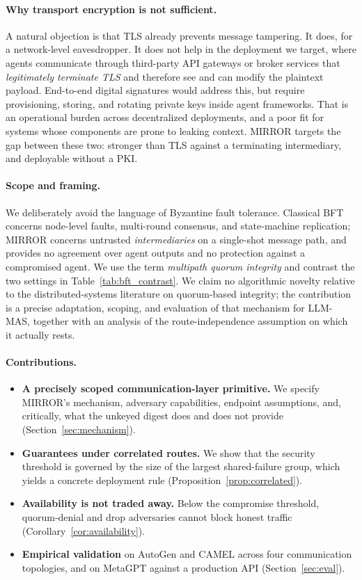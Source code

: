 \documentclass{article}
\begin{document}
\paragraph{Why transport encryption is not sufficient.}
A natural objection is that TLS already prevents message tampering. It does, for a network-level eavesdropper. It does not help in the deployment we target, where agents communicate through third-party API gateways or broker services that \emph{legitimately terminate TLS} and therefore see and can modify the plaintext payload. End-to-end digital signatures would address this, but require provisioning, storing, and rotating private keys inside agent frameworks. That is an operational burden across decentralized deployments, and a poor fit for systems whose components are prone to leaking context. MIRROR targets the gap between these two: stronger than TLS against a terminating intermediary, and deployable without a PKI.

\paragraph{Scope and framing.}
We deliberately avoid the language of Byzantine fault tolerance. Classical BFT \citep{lamport1982byzantine, castro1999pbft} concerns node-level faults, multi-round consensus, and state-machine replication; MIRROR concerns untrusted \emph{intermediaries} on a single-shot message path, and provides no agreement over agent outputs and no protection against a compromised agent. We use the term \emph{multipath quorum integrity} and contrast the two settings in Table~\ref{tab:bft_contrast}. We claim no algorithmic novelty relative to the distributed-systems literature on quorum-based integrity; the contribution is a precise adaptation, scoping, and evaluation of that mechanism for LLM-MAS, together with an analysis of the route-independence assumption on which it actually rests.

\paragraph{Contributions.}
\begin{itemize}
    \item \textbf{A precisely scoped communication-layer primitive.} We specify MIRROR's mechanism, adversary capabilities, endpoint assumptions, and, critically, what the unkeyed digest does and does not provide (Section~\ref{sec:mechanism}).
    \item \textbf{Guarantees under correlated routes.} We show that the security threshold is governed by the size of the largest shared-failure group, which yields a concrete deployment rule (Proposition~\ref{prop:correlated}).
    \item \textbf{Availability is not traded away.} Below the compromise threshold, quorum-denial and drop adversaries cannot block honest traffic (Corollary~\ref{cor:availability}).
    \item \textbf{Empirical validation} on AutoGen and CAMEL across four communication topologies, and on MetaGPT against a production API (Section~\ref{sec:eval}).
\end{itemize}
\end{document}
